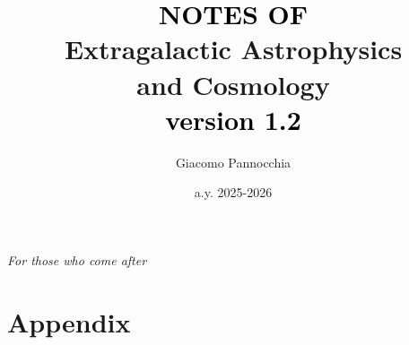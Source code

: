 \documentclass[a4paper,twoside,openright,titlepage,
               headinclude,footinclude,BCOR5mm,
               numbers=noenddot,cleardoublepage=empty,
               tablecaptionabove]{scrbook}
\author{Giacomo Pannocchia}
\title{\textcolor{black}{NOTES OF}\\ \textcolor{RawSienna}{Extragalactic Astrophysics \\ and Cosmology} \\ \vspace{7pt}\large \quad \quad \quad \quad \quad \textcolor{black}{version 1.2}}
\date{a.y. 2025-2026}
\begin{document}
  \begin{titlepage}
    \maketitle
  \end{titlepage}

\cleardoublepage
\newpage

\pagestyle{empty}

\thispagestyle{empty}
    \null{}
        \begin{flushright}
          \Large
                \emph{For those who come after}
        
        \end{flushright}
\null

\cleardoublepage
\newpage

\pagestyle{empty}
\setcounter{page}{1}

% 



\cleardoublepage
\newpage

\tableofcontents
\cleardoublepage
\newpage

\mainmatter
\pagestyle{scrheadings}

\setcounter{page}{1}











\part{Appendix}


\cleardoublepage
{}


\cleardoublepage
{}
{}
\small


\end{document}
